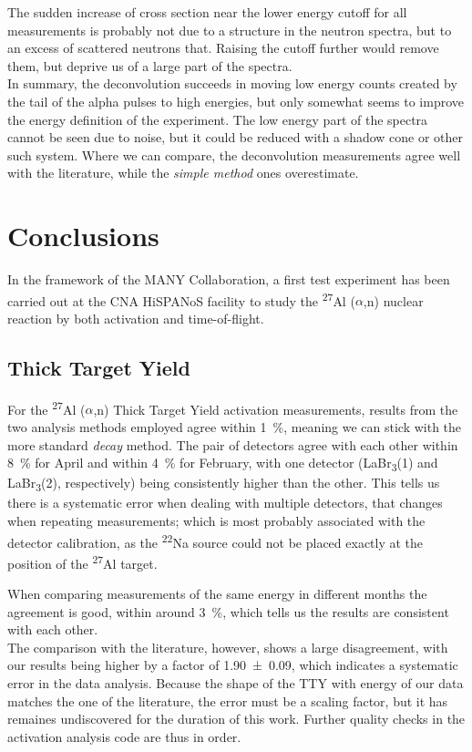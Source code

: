 \documentclass[a4paper,12pt]{report}
\newcommand{\an}{($\alpha$,n) }
\newcommand{\Aliso}{\textsuperscript{27}Al }
\newcommand{\Na}{\textsuperscript{22}Na }
\begin{document}
The sudden increase of cross section near the lower energy cutoff for all measurements is probably not due to a structure in the neutron spectra, but to an excess of scattered neutrons that.
Raising the cutoff further would remove them, but deprive us of a large part of the spectra.
\\

In summary, the deconvolution succeeds in moving low energy counts created by the tail of the alpha pulses to high energies, but only somewhat seems to improve the energy definition of the experiment.
The low energy part of the spectra cannot be seen due to noise, but it could be reduced with a shadow cone or other such system.
Where we can compare, the deconvolution measurements agree well with the literature, while the \textit{simple method} ones overestimate.

\chapter{Conclusions}
In the framework of the MANY Collaboration, a first test experiment has been carried out at the CNA HiSPANoS facility to study the \Aliso\an nuclear reaction by both activation and time-of-flight.

\section{Thick Target Yield}
For the \Aliso\an Thick Target Yield activation measurements, results from the two analysis methods employed agree within \qty{1}{\percent}, meaning we can stick with the more standard \textit{decay} method.
The pair of detectors agree with each other within \qty{8}{\percent} for April and within \qty{4}{\percent} for February, with one detector (LaBr\textsubscript{3}(1) and LaBr\textsubscript{3}(2), respectively) being consistently higher than the other.
This tells us there is a systematic error when dealing with multiple detectors, that changes when repeating measurements; which is most probably associated with the detector calibration, as the \Na source could not be placed exactly at the position of the \Aliso target.

When comparing measurements of the same energy in different months the agreement is good, within around \qty{3}{\percent}, which tells us the results are consistent with each other.
\\

The comparison with the literature, however, shows a large disagreement, with our results being higher by a factor of \num{1.90(9)}, which indicates a systematic error in the data analysis.
Because the shape of the TTY with energy of our data matches the one of the literature, the error must be a scaling factor, but it has remaines undiscovered for the duration of this work.
Further quality checks in the activation analysis code are thus in order.
\\
\end{document}
